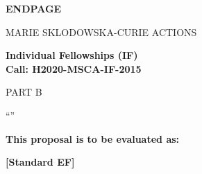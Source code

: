 \newpage
\vspace{15mm}
\begin{center}


        \Large{


        \textbf{ENDPAGE}

          \vspace{15mm}
          MARIE SKLODOWSKA-CURIE ACTIONS\\
          \vspace{1cm}

          \textbf{Individual Fellowships (IF)}\\
          \textbf{Call: H2020-MSCA-IF-2015}
          \vspace{2cm}

          PART B
          \vspace{2.5cm}

          ``\proposalAcronym''
          \vspace{2cm}

          \textbf{This proposal is to be evaluated as:}
          \vspace{.5cm}

          \textbf{[Standard EF]}
        }

  \end{center}
\vspace{1cm}
